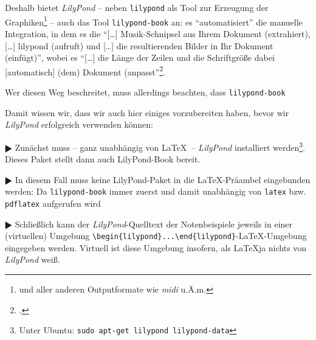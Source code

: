Deshalb bietet \emph{LilyPond} -- neben \texttt{lilypond} als Tool zur Erzeugung
der Graphiken\footnote{und aller anderen Outputformate wie \emph{midi} u.Ä.m.}
-- auch das Tool \texttt{lilypond-book} an: es \enquote{automatisiert} die
manuelle Integration, in dem es die \enquote{[\ldots] Musik-Schnipsel aus Ihrem
Dokument (extrahiert), [\ldots] lilypond (aufruft) und [\ldots] die
resultierenden Bilder in Ihr Dokument (einfügt)}, wobei es \enquote{[\ldots] die
Länge der Zeilen und die Schriftgröße dabei [automatisch] (dem) Dokument
(anpasst}\footcite[vgl.][20]{LilyPond2018e}.


Wer diesen Weg beschreitet, muss
allerdings beachten, dass \texttt{lilypond-book} 


Damit wissen wir, dass wir auch hier einiges vorzubereiten haben, bevor wir
\emph{LilyPond} erfolgreich verwenden können:

$\RHD$ Zunächst muss -- ganz unabhängig von \LaTeX\ -- \emph{LilyPond}
installiert werden\footnote{Unter Ubuntu: \texttt{sudo apt-get lilypond
lilypond-data}}. Dieses Paket stellt dann auch LilyPond-Book bereit.
  
$\RHD$ In diesem Fall muss keine LilyPond-Paket in die \LaTeX-Präambel
eingebunden werden: Da \texttt{lilypond-book} immer zuerst und damit unabhängig
von \texttt{latex} bzw.
\texttt{pdflatex} aufgerufen wird

$\RHD$ Schließlich kann der \emph{LilyPond}-Quelltext der Notenbeispiele jeweils
in einer (virtuellen) Umgebung
\verb|\begin{lilypond}...\end{lilypond}|-\LaTeX-Umgebung eingegeben werden.
Virtuell ist diese Umgebung insofern, als \LaTeX ja nichts von \emph{LilyPond} weiß.



%
